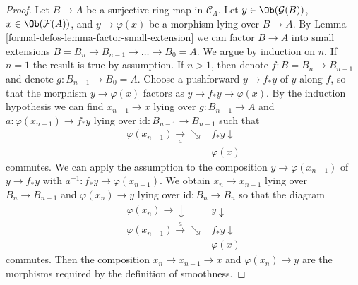 \begin{proof}
Let $B \to A$ be a surjective ring map in $\mathcal{C}_\Lambda$.
Let $y \in \Ob(\mathcal{G}(B))$, $x \in \Ob(\mathcal{F}(A))$,
and $y \to \varphi(x)$ be a morphism lying over $B \to A$. By
Lemma \ref{formal-defos-lemma-factor-small-extension} we can factor $B \to A$ into
small extensions $B = B_n \to B_{n-1} \to \ldots \to B_0 = A$.
We argue by induction on $n$. If $n = 1$ the result is true by assumption.
If $n > 1$, then denote $f : B = B_n \to B_{n - 1}$ and denote
$g : B_{n - 1} \to B_0 = A$. Choose a pushforward
$y \to f_* y$ of $y$ along $f$, so that the morphism $y \to \varphi(x)$
factors as $y \to f_* y \to \varphi(x)$. By the induction hypothesis
we can find $x_{n - 1} \to x$ lying over $g : B_{n - 1} \to A$ and
$a : \varphi(x_{n - 1}) \to f_*y$ lying over
$\text{id} : B_{n - 1} \to B_{n - 1}$ such that
$$
\begin{array}{cc}\varphi(x_{n - 1}) \underset{a}{\longrightarrow}\searrow & f_*y \downarrow \\  & \varphi(x)\end{array}
$$
commutes. We can apply the assumption to the composition
$y \to \varphi(x_{n - 1})$ of
$y \to f_*y$ with $a^{-1} : f_*y \to \varphi(x_{n - 1})$. We obtain
$x_n \to x_{n - 1}$ lying over $B_n \to B_{n - 1}$ and
$\varphi(x_n) \to y$ lying over  $\text{id} : B_n \to B_n$ so that the diagram
$$
\begin{array}{cc}\varphi(x_n) \longrightarrow\downarrow & y \downarrow \\ \varphi(x_{n - 1}) \overset{a}{\longrightarrow}\searrow & f_*y \downarrow \\  & \varphi(x)\end{array}
$$
commutes. Then the composition $x_n \to x_{n - 1} \to x$ and
$\varphi(x_n) \to y$ are the morphisms required by the definition of
smoothness.
\end{proof}

